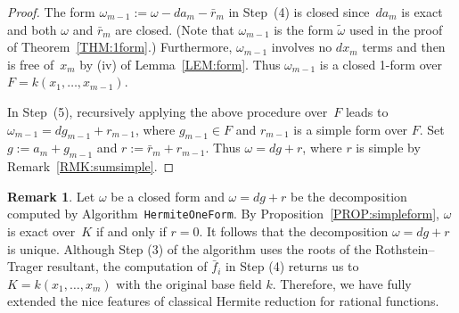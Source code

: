\documentclass{amsart}
\theoremstyle{definition}
\newtheorem{remark}[thm]{Remark}
\numberwithin{equation}{section}
\numberwithin{thm}{section}
\begin{document}
\begin{proof}

The form $\omega_{m-1}:=\omega-da_m-\bar{r}_m$ in Step~(4) is closed since~$d a_m$ is exact and both $\omega$ and $\bar{r}_m$ are closed. (Note that $\omega_{m-1}$ is the form $\widetilde \omega$ used in the proof of Theorem~\ref{THM:1form}.) Furthermore, $\omega_{m-1}$ involves no $dx_m$ terms and then is free of~$x_m$ by {\rm(iv)} of Lemma~\ref{LEM:form}.  Thus $\omega_{m-1}$ is a closed 1-form over $F = k(x_1,\dots,x_{m-1})$.

In Step~(5), recursively applying the above procedure over~$F$ leads to $\omega_{m-1}= dg_{m-1}+r_{m-1}$,
where $g_{m-1}\in F$ and $r_{m-1}$ is a simple form over $F$.
Set $g := a_m+g_{m-1}$ and $r := \bar{r}_m + r_{m-1}$. Thus $\omega = dg + r$, where $r$ is simple by Remark~\ref{RMK:sumsimple}. 
\end{proof}
\begin{remark}\label{RMK:rational}
	Let $\omega$ be a closed form and $\omega = dg + r$ be the decomposition computed by Algorithm~\texttt{HermiteOneForm}. By Proposition~\ref{PROP:simpleform}, $\omega$ is exact over~$K$ if and only if $r = 0$. 
It follows that the decomposition $\omega = dg + r$ is unique.  Although Step (3) of the algorithm uses the roots of the Rothstein--Trager resultant, the computation of $\bar f_i$ in Step (4) returns us to $K = k(x_1,\dots,x_m)$ with the original base field $k$.  Therefore, we have fully extended the nice features of classical Hermite reduction for rational functions. 
\end{remark}
\end{document}
